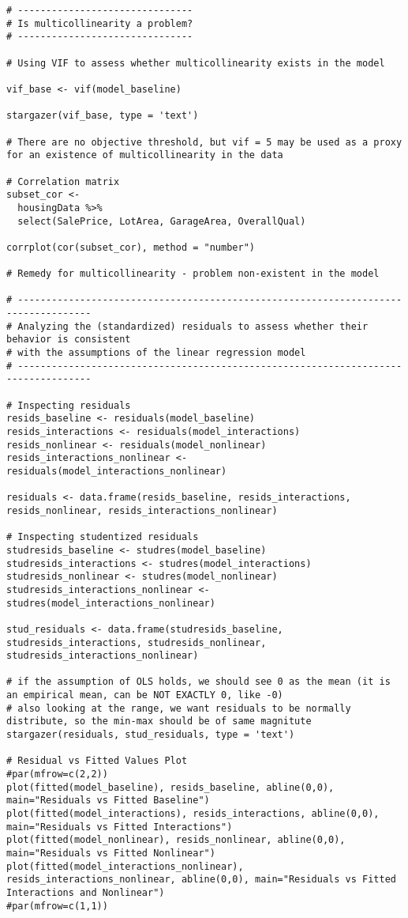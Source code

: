 \documentclass{article}
\begin{document}
\begin{tiny}
\begin{verbatim}
# -------------------------------
# Is multicollinearity a problem?
# -------------------------------

# Using VIF to assess whether multicollinearity exists in the model

vif_base <- vif(model_baseline)

stargazer(vif_base, type = 'text')

# There are no objective threshold, but vif = 5 may be used as a proxy for an existence of multicollinearity in the data

# Correlation matrix
subset_cor <- 
  housingData %>%
  select(SalePrice, LotArea, GarageArea, OverallQual)

corrplot(cor(subset_cor), method = "number")

# Remedy for multicollinearity - problem non-existent in the model

# -----------------------------------------------------------------------------------
# Analyzing the (standardized) residuals to assess whether their behavior is consistent 
# with the assumptions of the linear regression model
# -----------------------------------------------------------------------------------

# Inspecting residuals
resids_baseline <- residuals(model_baseline)
resids_interactions <- residuals(model_interactions)
resids_nonlinear <- residuals(model_nonlinear)
resids_interactions_nonlinear <- residuals(model_interactions_nonlinear)

residuals <- data.frame(resids_baseline, resids_interactions, resids_nonlinear, resids_interactions_nonlinear)

# Inspecting studentized residuals
studresids_baseline <- studres(model_baseline)
studresids_interactions <- studres(model_interactions)
studresids_nonlinear <- studres(model_nonlinear)
studresids_interactions_nonlinear <- studres(model_interactions_nonlinear)

stud_residuals <- data.frame(studresids_baseline, studresids_interactions, studresids_nonlinear, studresids_interactions_nonlinear)

# if the assumption of OLS holds, we should see 0 as the mean (it is an empirical mean, can be NOT EXACTLY 0, like -0)
# also looking at the range, we want residuals to be normally distribute, so the min-max should be of same magnitute
stargazer(residuals, stud_residuals, type = 'text')

# Residual vs Fitted Values Plot
#par(mfrow=c(2,2))
plot(fitted(model_baseline), resids_baseline, abline(0,0), main="Residuals vs Fitted Baseline")
plot(fitted(model_interactions), resids_interactions, abline(0,0), main="Residuals vs Fitted Interactions")
plot(fitted(model_nonlinear), resids_nonlinear, abline(0,0), main="Residuals vs Fitted Nonlinear")
plot(fitted(model_interactions_nonlinear), resids_interactions_nonlinear, abline(0,0), main="Residuals vs Fitted Interactions and Nonlinear")
#par(mfrow=c(1,1))


\end{verbatim}
\end{tiny}
\end{document}
